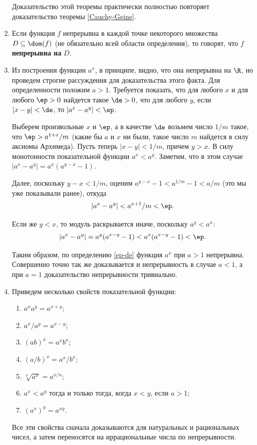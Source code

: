 \begin{enumerate}
Доказательство этой теоремы практически полностью повторяет доказательство теоремы  \ref{Cauchy-Geine}.

\item Если функция $f$ непрерывна в каждой точке некоторого множества $D\subseteq\dom(f)$ (не обязательно всей области определения), то говорят, что $f$ \textbf{непрерывна на} $D$.

\item Из построения функции $a^x$, в принципе, видно, что она непрерывна на $\R$, но проведем строгие рассуждения для доказательства этого факта. Для определенности положим $a>1$. Требуется показать, что для любого $x$ и для любого $\ep>0$ найдется такое $\de>0$, что для любого $y$, если $|x-y|<\de$, то $|a^x-a^y|<\ep$.

Выберем произвольные $x$ и $\ep$, а в качестве $\de$ возьмем число $1/m$ такое, что $\ep>a^{1+x}/m$ (какие бы $a$ и $x$ ни были, такое число $m$ найдется в силу аксиомы Архимеда). Пусть теперь $|x-y|<1/m$, причем $y>x$. В силу монотонности показательной функции $a^x<a^y$. Заметим, что в этом случае $|a^x-a^y|=a^x(a^{y-x}-1)$.

Далее, поскольку $y-x<1/m$, оценим $a^{y-x}-1<a^{1/m}-1<a/m$ (это мы уже показывали ранее), откуда
$$
|a^x-a^y|<a^{x+1}/m<\ep.
$$

Если же $y<x$, то модуль раскрывается иначе, поскольку $a^y<a^x$:
$$
|a^x-a^y|=a^y(a^{x-y}-1)<a^x(a^{x-y}-1)<\ep.
$$

Таким образом, по определению \eqref{ep-de} функция $a^x$ при $a>1$ непрерывна. Совершенно точно так же доказывается и непрерывность в случае $a<1$, а при $a=1$ доказательство непрерывности тривиально.




\item Приведем несколько свойств показательной функции:
\begin{enumerate}[\bf Pow1]
\item $a^xa^y = a^{x+y}$;
\item $a^x/a^y=a^{x-y}$;
\item $(ab)^x = a^x b^x$;
\item $(a/b)^x = a^x/b^x$;
\item $\sqrt[n]{a^x}=a^{x/n}$;
\item $a^x<a^y$ тогда и только тогда, когда $x<y$, если $a>1$;
\item $(a^x)^y = a^{xy}$.
\end{enumerate}
Все эти свойства сначала доказываются для натуральных и рациональных чисел, а затем переносятся на иррациональные числа по непрерывности.


\end{enumerate}
